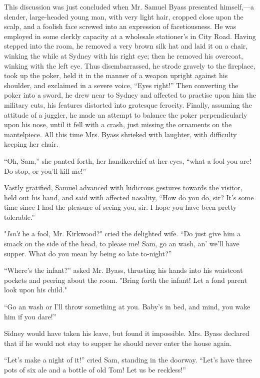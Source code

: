 This discussion was just concluded when Mr. Samuel Byass presented
himself,---a slender, large-headed young man, with very light hair,
cropped close upon the scalp, and a foolish face screwed into an
expression of facetiousness. He was employed in some clerkly capacity at
a wholesale stationer's in City Road. Having stepped into the room, he
removed a very brown silk hat and laid it on a chair, winking the while
at Sydney with his right eye; then he removed his overcoat, winking with
the left eye. Thus disembarrassed, he strode gravely to the fireplace,
took up the poker, held it in the manner of a weapon upright against his
shoulder, and exclaimed in a severe voice, ``Eyes right!'' Then
converting the poker into a sword, he drew near to Sydney and affected
to practise upon him the military cuts, his features
{\protect\hypertarget{161}{}{}}distorted into grotesque ferocity.
Finally, assuming the attitude of a juggler, he made an attempt to
balance the poker perpendicularly upon his nose, until it fell with a
crash, just missing the ornaments on the mantelpiece. All this time Mrs.
Byass shrieked with laughter, with difficulty keeping her chair.

``Oh, Sam,'' she panted forth, her handkerchief at her eyes, ``what a
fool you are! Do stop, or you'll kill me!''

Vastly gratified, Samuel advanced with ludicrous gestures towards the
visitor, held out his hand, and said with affected nasality, ``How do
you do, sir? It's some time since I had the pleasure of seeing you, sir.
I hope you have been pretty tolerable.''

"\emph{Isn't} he a fool, Mr. Kirkwood?" cried the delighted wife. ``Do
just give him a smack on the side of the head, to please me! Sam, go an
wash, an' we'll have supper. What do you mean by being so late
to-night?''

``Where's the infant?'' asked Mr. Byass, thrusting his hands into his
waistcoat pockets and peering about the room. "Bring forth
{\protect\hypertarget{162}{}{}}the infant! Let a fond parent look upon
his child."

``Go an wash or I'll throw something at you. Baby's in bed, and mind,
you wake him if you dare!''

Sidney would have taken his leave, but found it impossible. Mrs. Byass
declared that if he would not stay to supper he should never enter the
house again.

``Let's make a night of it!'' cried Sam, standing in the doorway.
``Let's have three pots of six ale and a bottle of old Tom! Let us be
reckless!''

